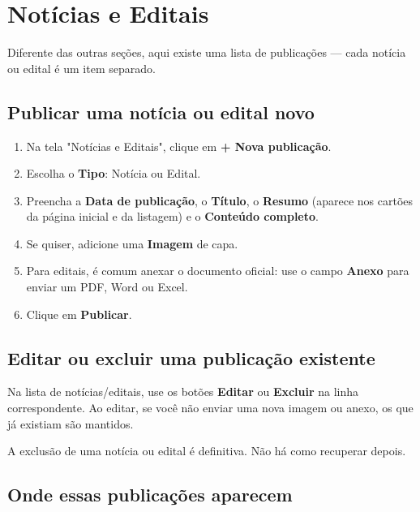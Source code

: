 \documentclass[11pt,a4paper]{article}
\begin{document}
\section{Notícias e Editais}

Diferente das outras seções, aqui existe uma lista de publicações — cada notícia ou edital é um
item separado.

\subsection{Publicar uma notícia ou edital novo}

\begin{enumerate}[leftmargin=2em]
    \item Na tela "Notícias e Editais", clique em \textbf{+ Nova publicação}.
    \item Escolha o \textbf{Tipo}: Notícia ou Edital.
    \item Preencha a \textbf{Data de publicação}, o \textbf{Título}, o \textbf{Resumo} (aparece
          nos cartões da página inicial e da listagem) e o \textbf{Conteúdo completo}.
    \item Se quiser, adicione uma \textbf{Imagem} de capa.
    \item Para editais, é comum anexar o documento oficial: use o campo \textbf{Anexo} para
          enviar um PDF, Word ou Excel.
    \item Clique em \textbf{Publicar}.
\end{enumerate}

\subsection{Editar ou excluir uma publicação existente}

Na lista de notícias/editais, use os botões \textbf{Editar} ou \textbf{Excluir} na linha
correspondente. Ao editar, se você não enviar uma nova imagem ou anexo, os que já existiam são
mantidos.

\begin{aviso}
A exclusão de uma notícia ou edital é definitiva. Não há como recuperar depois.
\end{aviso}

\subsection{Onde essas publicações aparecem}
\end{document}
